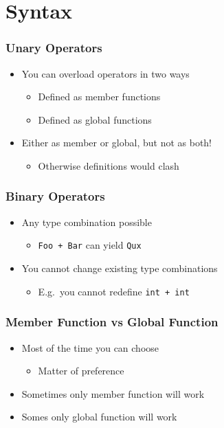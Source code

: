 \section{Syntax}
\frame{\tableofcontents[currentsection]}

\begin{frame}
  \frametitle{Unary Operators}
  \vskip-5mm
  \begin{itemize}
    \item You can overload operators in two ways
          \begin{itemize}
            \item Defined as member functions
            \item Defined as global functions
          \end{itemize}
    \item Either as member or global, but not as both!
          \begin{itemize}
            \item Otherwise definitions would clash
          \end{itemize}
  \end{itemize}
\end{frame}

\begin{frame}
  \frametitle{Binary Operators}
  \begin{itemize}
    \item Any type combination possible
          \begin{itemize}
            \item \texttt{Foo + Bar} can yield \texttt{Qux}
          \end{itemize}
    \item You cannot change existing type combinations
          \begin{itemize}
            \item E.g.~you cannot redefine \texttt{int + int}
          \end{itemize}
  \end{itemize}
\end{frame}

\begin{frame}
  \frametitle{Member Function vs Global Function}
  \begin{itemize}
    \item Most of the time you can choose
          \begin{itemize}
            \item Matter of preference
          \end{itemize}
    \item Sometimes only member function will work
    \item Somes only global function will work
  \end{itemize}
\end{frame}

